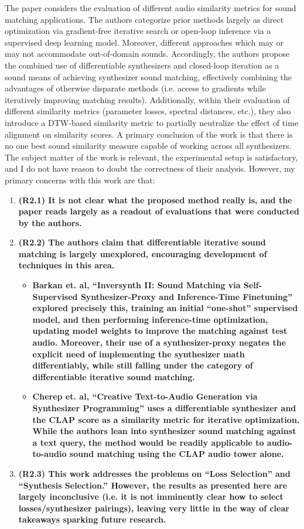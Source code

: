 \documentclass[11pt]{article}
\begin{document}
\noindent
The paper considers the evaluation of different audio similarity metrics for sound matching applications.  The authors categorize prior methods largely as direct optimization via gradient-free iterative search or open-loop inference via a supervised deep learning model.  Moreover, different approaches which may or may not accommodate out-of-domain sounds.  Accordingly, the authors propose the combined use of differentiable synthesizers and closed-loop iteration as a sound means of achieving synthesizer sound matching, effectively combining the advantages of otherwise disparate methods (i.e. access to gradients while iteratively improving matching results).  Additionally, within their evaluation of different similarity metrics (parameter losses, spectral distances, etc.), they also introduce a DTW-based similarity metric to partially neutralize the effect of time alignment on similarity scores.  A primary conclusion of the work is that there is no one best sound similarity measure capable of working across all synthesizers.  \\
The subject matter of the work is relevant, the experimental setup is satisfactory, and I do not have reason to doubt the correctness of their analysis.  However, my primary concerns with this work are that:  
\begin{enumerate}
  \item \textbf{(R2.1) It is not clear what the proposed method really is, and the paper reads largely as a readout of evaluations that were conducted by the authors.}  
  \item \textbf{(R2.2) The authors claim that differentiable iterative sound matching is largely unexplored, encouraging development of techniques in this area.}  
    \begin{itemize}
      \item \textbf{Barkan et. al, ``Inversynth II: Sound Matching via Self-Supervised Synthesizer-Proxy and Inference-Time Finetuning'' explored precisely this, training an initial ``one-shot'' supervised model, and then performing inference-time optimization, updating model weights to improve the matching against test audio.  Moreover, their use of a synthesizer-proxy negates the explicit need of implementing the synthesizer math differentiably, while still falling under the category of differentiable iterative sound matching.}  
      \item \textbf{Cherep et. al, ``Creative Text-to-Audio Generation via Synthesizer Programming'' uses a differentiable synthesizer and the CLAP score as a similarity metric for iterative optimization.  While the authors lean into synthesizer sound matching against a text query, the method would be readily applicable to audio-to-audio sound matching using the CLAP audio tower alone.}  
    \end{itemize}
  \item \textbf{(R2.3) This work addresses the problems on ``Loss Selection'' and ``Synthesis Selection.''  However, the results as presented here are largely inconclusive (i.e. it is not imminently clear how to select losses/synthesizer pairings), leaving very little in the way of clear takeaways sparking future research.}
\end{enumerate}
\end{document}
